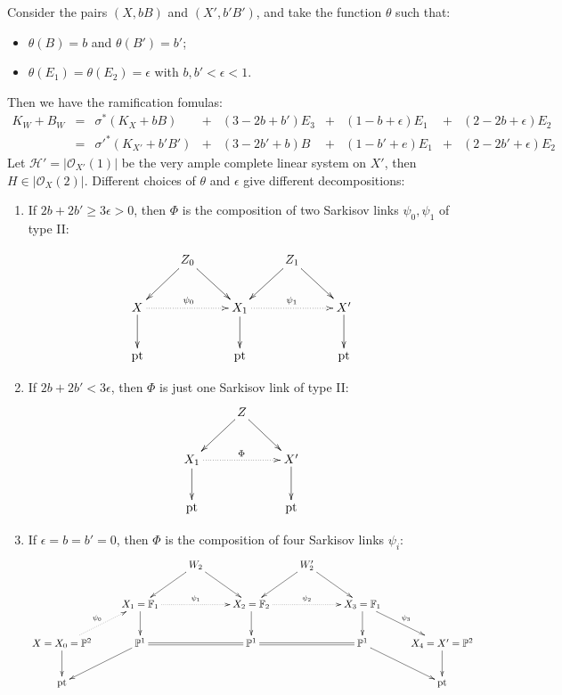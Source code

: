 \documentclass[11pt]{amsart}
\begin{document}
Consider the pairs $ (X,bB) $ and $ (X',b'B') $, and take the function $\theta$ such that:
\begin{itemize}
  \item $\theta(B)=b$ and $\theta(B')=b'$;
  \item $\theta(E_{1})=\theta(E_{2})=\epsilon$ with $b,b'<\epsilon<1$. 
\end{itemize}
Then we have the ramification fomulas:
\[ \begin{array}{rllllllllll}
  K_W+B_W&=&\sigma^*(K_X+bB)&+& (3-2b+b')E_3&+&(1-b+\epsilon)E_1&+&(2-2b+\epsilon)E_2&\\
  &=&\sigma'^*(K_{X'}+b'B')&+&(3-2b'+b)B&+&(1-b'+e)E_1&+&(2-2b'+\epsilon)E_2&
\end{array} \]
Let $ \mathcal{H}'=|\mathcal{O}_{X'}(1)| $ be the very ample complete linear system on $X'$, then $H\in |\mathcal{O}_{X}(2)|$. Different choices of $\theta$ and  $\epsilon$ give different decompositions: 
\begin{enumerate}
  \item\label{example1.1} If $ 2b+2b'\geqslant 3\epsilon>0 $, then $\Phi$ is the composition of two Sarkisov links $\psi_{0},\psi_{1}$ of type II:

    \[
      \xymatrix{
    &Z_{0}\ar[rd]\ar[ld] & &Z_{1}\ar[rd]\ar[ld]\\
        X\ar[d]\ar@{.>}[rr]^{\psi_{0}}& &X_{1}\ar@{.>}[rr]^{\psi_{1}}\ar[d]&&X'\ar[d]\\
        \text{pt}&&\text{pt}&&\text{pt}
      }
    \]
  \item If $ 2b+2b'< 3\epsilon $, then $\Phi$ is just one Sarkisov link  of type II:
    \[
      \xymatrix{
    &Z\ar[rd]\ar[ld] & \\
        X_{1}\ar@{.>}[rr]^{\Phi}\ar[d]& &X'\ar[d]\\
        \text{pt}&&\text{pt}
      }
    \]
  \item If $ \epsilon=b=b'=0 $, then $\Phi$ is the composition of four Sarkisov links $\psi_{i}$:
\[ \xymatrix{
&&W_2\ar[ld]\ar[rd]&&W_2'\ar[ld]\ar[rd]\\
&X_1=\mathbb{F}_1\ar@{.>}[rr]^{\psi_{1}}\ar[d]&&X_2=\mathbb{F}_2\ar@{.>}[rr]^{\psi_{2}}\ar[d]&&X_3=\mathbb{F}_1\ar[d]\ar[rd]^{\psi_{3}}\\
X=X_0=\mathbb{P}^2\ar[d]\ar@{.>}[ru]^{\psi_{0}}&\mathbb{P}^1\ar[ld]\ar@{=}[rr]&&\mathbb{P}^1\ar@{=}[rr]&&\mathbb{P}^1\ar[rd]&X_4=X'=\mathbb{P}^2\ar[d]\\
\text{pt}&&&&&&\text{pt} } \]
\end{enumerate}
\end{document}
